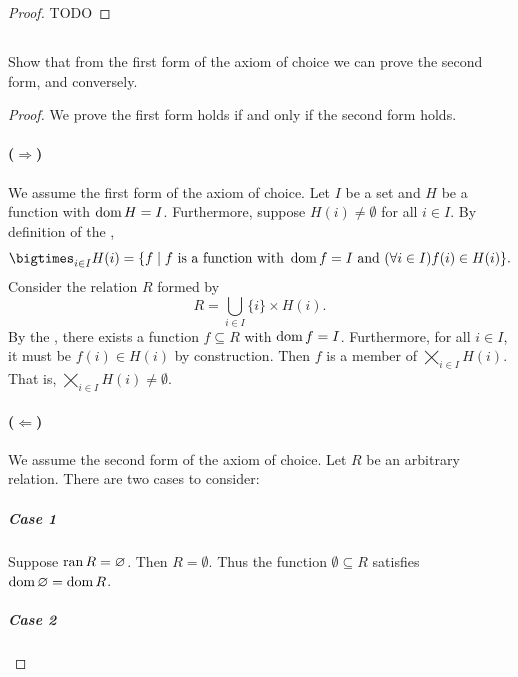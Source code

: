 \documentclass{report}
\begin{document}
\begin{proof}

  TODO

\end{proof}

\subsection{}%
\label{sub:exercise-3.31}

Show that from the first form of the axiom of choice we can prove the second
  form, and conversely.

\begin{proof}

  We prove the first form holds if and only if the second form holds.

  \paragraph{($\Rightarrow$)}%

    We assume the first form of the axiom of choice.
    Let $I$ be a set and $H$ be a function with $\mathop{\text{dom}}{H} = I$.
    Furthermore, suppose $H(i) \neq \emptyset$ for all $i \in I$.
    By definition of the ,
      $$\bigtimes_{i \in I} H(i) = \{f \mid
        f \text{ is a function with } \dom{f} = I \text{ and }
          (\forall i \in I) f(i) \in H(i)\}.$$
    Consider the relation $R$ formed by
      $$R = \bigcup_{i \in I} \{i\} \times H(i).$$
    By the , there exists a function
      $f \subseteq R$ with $\mathop{\text{dom}}{f} = I$.
    Furthermore, for all $i \in I$, it must be $f(i) \in H(i)$ by construction.
    Then $f$ is a member of $\bigtimes_{i \in I} H(i)$.
    That is, $\bigtimes_{i \in I} H(i) \neq \emptyset$.

  \paragraph{($\Leftarrow$)}%

    We assume the second form of the axiom of choice.
    Let $R$ be an arbitrary relation.
    There are two cases to consider:

    \subparagraph{Case 1}%

      Suppose $\mathop{\text{ran}}{R} = \varnothing$.
      Then $R = \emptyset$.
      Thus the function $\emptyset \subseteq R$ satisfies
        $\mathop{\text{dom}}{\varnothing} = \mathop{\text{dom}}{R}$.

    \subparagraph{Case 2}%


\end{proof}
\end{document}
